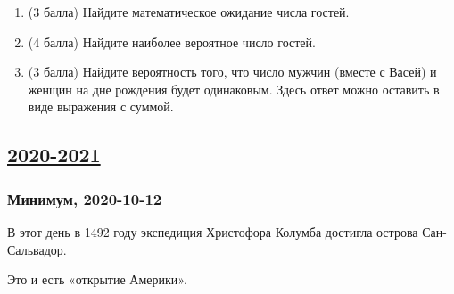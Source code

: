 \begin{enumerate}
  \begin{enumerate}
      \item (3 балла) Найдите математическое ожидание числа гостей.
      \item (4 балла) Найдите наиболее вероятное число гостей.
      \item (3 балла) Найдите вероятность того, что число мужчин (вместе с Васей) 
      и женщин на дне рождения будет одинаковым. 
      Здесь ответ можно оставить в виде выражения с суммой. 
  \end{enumerate}
  
  
  \end{enumerate}
  

\subsection[2020-2021]{\hyperref[sec:sol_kr_01_2020_2021]{2020-2021}}
\label{sec:kr_01_2020_2021} %


\subsubsection*{Минимум, 2020-10-12}

В этот день в 1492 году экспедиция Христофора Колумба достигла острова Сан-Сальвадор. 

Это и есть «открытие Америки».

